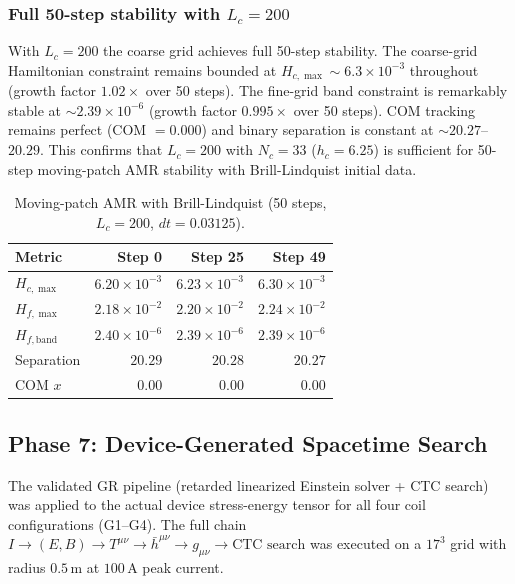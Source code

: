 \subsubsection{Full 50-step stability with $L_c=200$}

With $L_c=200$ the coarse grid achieves full 50-step stability. The coarse-grid Hamiltonian constraint remains bounded at $H_{c,\max} \sim 6.3\times 10^{-3}$ throughout (growth factor $1.02\times$ over 50 steps). The fine-grid band constraint is remarkably stable at $\sim 2.39\times 10^{-6}$ (growth factor $0.995\times$ over 50 steps). COM tracking remains perfect (COM $= 0.000$) and binary separation is constant at $\sim 20.27$--$20.29$. This confirms that $L_c=200$ with $N_c=33$ ($h_c=6.25$) is sufficient for 50-step moving-patch AMR stability with Brill-Lindquist initial data.

\begin{table}[t]
\centering
\caption{Moving-patch AMR with Brill-Lindquist (50 steps, $L_c=200$, $dt=0.03125$).}
\label{tab:amr-moving-50-Lc200}
\begin{tabular}{lrrr}
\hline
Metric & Step 0 & Step 25 & Step 49 \\
\hline
$H_{c,\max}$ & $6.20\times 10^{-3}$ & $6.23\times 10^{-3}$ & $6.30\times 10^{-3}$ \\
$H_{f,\max}$ & $2.18\times 10^{-2}$ & $2.20\times 10^{-2}$ & $2.24\times 10^{-2}$ \\
$H_{f,\text{band}}$ & $2.40\times 10^{-6}$ & $2.39\times 10^{-6}$ & $2.39\times 10^{-6}$ \\
Separation & $20.29$ & $20.28$ & $20.27$ \\
COM $x$ & $0.00$ & $0.00$ & $0.00$ \\
\hline
\end{tabular}
\end{table}

\subsection{Phase 7: Device-Generated Spacetime Search}

The validated GR pipeline (retarded linearized Einstein solver + CTC search) was applied to the actual device stress-energy tensor for all four coil configurations (G1--G4). The full chain $I \to (E,B) \to T^{\mu\nu} \to \bar{h}^{\mu\nu} \to g_{\mu\nu} \to \text{CTC search}$ was executed on a $17^3$ grid with radius $0.5\,\text{m}$ at $100\,\text{A}$ peak current.

